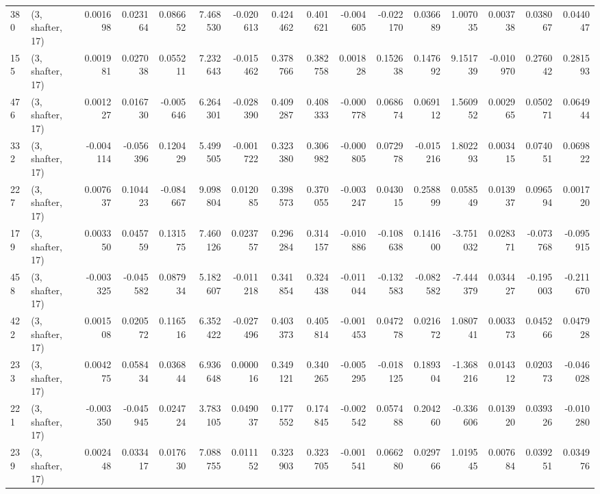 \begin{tabular}{llrrrrrrrrrrrrrr}
380 &  (3, shafter, 17) &   0.001698 &  0.023164 &  0.086652 &    7.468530 & -0.020613 &   0.424462 &  0.401621 & -0.004605 & -0.022170 &  0.036689 &     1.007035 &  0.003738 &  0.038067 &  0.044047 \\
155 &  (3, shafter, 17) &   0.001981 &  0.027038 &  0.055211 &    7.232643 & -0.015462 &   0.378766 &  0.382758 &  0.001828 &  0.152638 &  0.147692 &     9.151739 & -0.010970 &  0.276042 &  0.281593 \\
476 &  (3, shafter, 17) &   0.001227 &  0.016730 & -0.005646 &    6.264301 & -0.028390 &   0.409287 &  0.408333 & -0.000778 &  0.068674 &  0.069112 &     1.560952 &  0.002965 &  0.050271 &  0.064944 \\
332 &  (3, shafter, 17) &  -0.004114 & -0.056396 &  0.120429 &    5.499505 & -0.001722 &   0.323380 &  0.306982 & -0.000805 &  0.072978 & -0.015216 &     1.802293 &  0.003415 &  0.074051 &  0.069822 \\
227 &  (3, shafter, 17) &   0.007637 &  0.104423 & -0.084667 &    9.098804 &  0.012085 &   0.398573 &  0.370055 & -0.003247 &  0.043015 &  0.258899 &     0.058549 &  0.013937 &  0.096594 &  0.001720 \\
179 &  (3, shafter, 17) &   0.003350 &  0.045759 &  0.131575 &    7.460126 &  0.023757 &   0.296284 &  0.314157 & -0.010886 & -0.108638 &  0.141600 &    -3.751032 &  0.028371 & -0.073768 & -0.095915 \\
458 &  (3, shafter, 17) &  -0.003325 & -0.045582 &  0.087934 &    5.182607 & -0.011218 &   0.341854 &  0.324438 & -0.011044 & -0.132583 & -0.082582 &    -7.444379 &  0.034427 & -0.195003 & -0.211670 \\
422 &  (3, shafter, 17) &   0.001508 &  0.020572 &  0.116516 &    6.352422 & -0.027496 &   0.403373 &  0.405814 & -0.001453 &  0.047278 &  0.021672 &     1.080741 &  0.003373 &  0.045266 &  0.047928 \\
233 &  (3, shafter, 17) &   0.004275 &  0.058434 &  0.036844 &    6.936648 &  0.000016 &   0.349121 &  0.340265 & -0.005295 & -0.018125 &  0.189304 &    -1.368216 &  0.014312 &  0.020373 & -0.046028 \\
221 &  (3, shafter, 17) &  -0.003350 & -0.045945 &  0.024724 &    3.783105 &  0.049037 &   0.177552 &  0.174845 & -0.002542 &  0.057488 &  0.204260 &    -0.336606 &  0.013920 &  0.039326 & -0.010280 \\
239 &  (3, shafter, 17) &   0.002448 &  0.033417 &  0.017630 &    7.088755 &  0.011152 &   0.323903 &  0.323705 & -0.001541 &  0.066280 &  0.029766 &     1.019545 &  0.007684 &  0.039251 &  0.034976 \\

\end{tabular}
